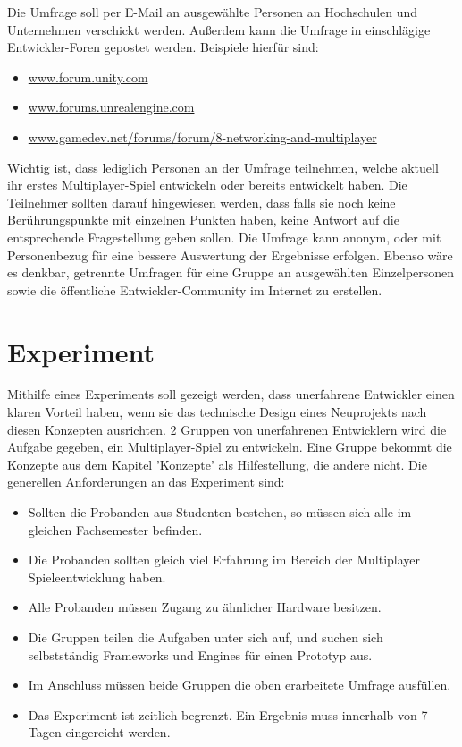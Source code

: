 Die Umfrage soll per E-Mail an ausgewählte Personen an Hochschulen und Unternehmen verschickt werden. Außerdem kann die Umfrage in einschlägige Entwickler-Foren gepostet werden. Beispiele hierfür sind:
\begin{itemize}
	\item \href{www.forum.unity.com}{www.forum.unity.com}
	\item \href{www.forums.unrealengine.com}{www.forums.unrealengine.com}
	\item \href{www.gamedev.net/forums/forum/8-networking-and-multiplayer}{www.gamedev.net/forums/forum/8-networking-and-multiplayer}
\end{itemize}

Wichtig ist, dass lediglich Personen an der Umfrage teilnehmen, welche aktuell ihr erstes Multiplayer-Spiel entwickeln oder bereits entwickelt haben. Die Teilnehmer sollten darauf hingewiesen werden, dass falls sie noch keine Berührungspunkte mit einzelnen Punkten haben, keine Antwort auf die entsprechende Fragestellung geben sollen. Die Umfrage kann anonym, oder mit Personenbezug für eine bessere Auswertung der Ergebnisse erfolgen. Ebenso wäre es denkbar, getrennte Umfragen für eine Gruppe an ausgewählten Einzelpersonen sowie die öffentliche Entwickler-Community im Internet zu erstellen.

\section{Experiment}

Mithilfe eines Experiments soll gezeigt werden, dass unerfahrene Entwickler einen klaren Vorteil haben, wenn sie das technische Design eines Neuprojekts nach diesen Konzepten ausrichten. 2 Gruppen von unerfahrenen Entwicklern wird die Aufgabe gegeben, ein Multiplayer-Spiel zu entwickeln. Eine Gruppe bekommt die Konzepte \hyperref[sec:konzepte]{aus dem Kapitel 'Konzepte'} als Hilfestellung, die andere nicht. Die generellen Anforderungen an das Experiment sind:

\begin{itemize}
	\item Sollten die Probanden aus Studenten bestehen, so müssen sich alle im gleichen Fachsemester befinden.
	\item Die Probanden sollten gleich viel Erfahrung im Bereich der Multiplayer Spieleentwicklung haben.
	\item Alle Probanden müssen Zugang zu ähnlicher Hardware besitzen.
	\item Die Gruppen teilen die Aufgaben unter sich auf, und suchen sich selbstständig Frameworks und Engines für einen Prototyp aus.
	\item Im Anschluss müssen beide Gruppen die oben erarbeitete Umfrage ausfüllen.
	\item Das Experiment ist zeitlich begrenzt. Ein Ergebnis muss innerhalb von 7 Tagen eingereicht werden. 
\end{itemize}

